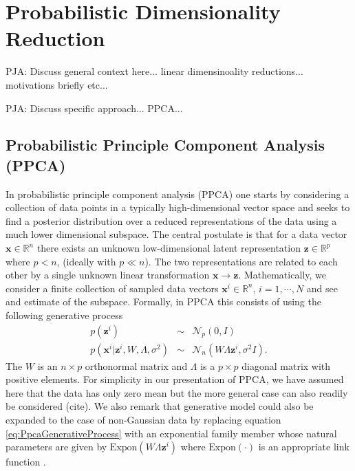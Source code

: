 \documentclass{article}
\newcommand{\commentPJA}[1]{{\textcolor{commentPJA_color}{PJA: #1}}}
\newcommand{\mb}[1]{\mathbf{#1}}
\begin{document}


\section{Probabilistic Dimensionality Reduction} \label{Probabilistic dimensionality reduction}

\commentPJA{Discuss general context here... linear dimensinoality reductions... motivations briefly etc...}

\commentPJA{Discuss specific approach... PPCA...}

\subsection{Probabilistic Principle Component Analysis (PPCA)}
In probabilistic principle component analysis (PPCA) one starts by considering a collection of data points in a typically high-dimensional vector space and seeks to find a posterior distribution over a reduced representations of the data using a much lower dimensional subspace.  The central postulate is that for a data vector $\mathbf{x} \in \mathbb{R}^n$ there exists an unknown low-dimensional latent representation $\mathbf{z} \in \mathbb{R}^p$ where $p < n$, (ideally with $p \ll n$).  The two representations are related to each other by a single unknown linear transformation $\mathbf{x} \rightarrow \mathbf{z}$.  Mathematically, we consider a finite collection of sampled data vectors $\mathbf{x}^i \in \mathbb{R}^n$, $i = 1, \cdots, N$ and see and estimate of the subspace.  Formally, in PPCA this consists of using the following generative process
\begin{eqnarray}
\label{eq:PpcaGenerativeProcess}
p(\mb{z}^i) &\sim& \mathcal{N}_p(0, I) \nonumber\\
p(\mb{x}^i | \mb{z}^i, W, \Lambda, \sigma^2) &\sim& \mathcal{N}_n(W \Lambda \mb{z}^i, \sigma^2 I).
\end{eqnarray}
The $W$ is an $n \times p$ orthonormal matrix and $\Lambda$ is a $p \times p$ diagonal matrix with positive elements.  For simplicity in our presentation of PPCA, we have assumed here that the data has only zero mean but the more general case can also readily be considered (cite).
We also remark that generative model could also be expanded to the case of non-Gaussian data by replacing equation \ref{eq:PpcaGenerativeProcess} with an exponential family member whose natural parameters are given by $\mathrm{Expon}(W\Lambda \mb{z}^i)$ where $\mathrm{Expon}(\cdot)$ is an appropriate link function \citep{mohamed2009bayesian}. 
\end{document}
